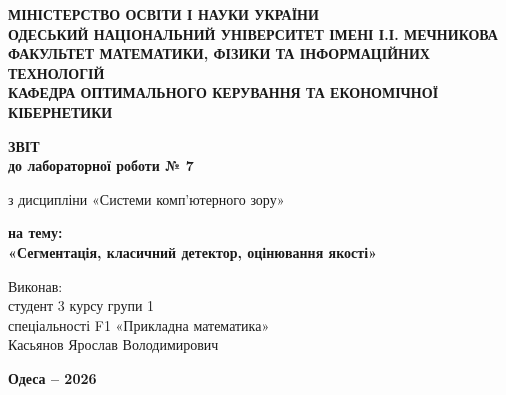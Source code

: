 \begin{titlepage}
    \thispagestyle{empty}
    \setlength{\parindent}{0pt}
    
    \begin{center}
        {\fontsize{12pt}{16pt}\selectfont\bfseries
        МІНІСТЕРСТВО ОСВІТИ І НАУКИ УКРАЇНИ\\[3pt]
        ОДЕСЬКИЙ НАЦІОНАЛЬНИЙ УНІВЕРСИТЕТ ІМЕНІ І.І. МЕЧНИКОВА\\[3pt]
        ФАКУЛЬТЕТ МАТЕМАТИКИ, ФІЗИКИ ТА ІНФОРМАЦІЙНИХ ТЕХНОЛОГІЙ\\[3pt]
        КАФЕДРА ОПТИМАЛЬНОГО КЕРУВАННЯ ТА ЕКОНОМІЧНОЇ КІБЕРНЕТИКИ\par}
    \end{center}

    \vspace{1.5cm}

    \begin{center}
        {\fontsize{18pt}{22pt}\selectfont\bfseries ЗВІТ\\
        до лабораторної роботи № 7\par}
        \vspace{0.4cm}
        {\fontsize{14pt}{18pt}\selectfont
        з дисципліни «Системи комп’ютерного зору»\par}
        \vspace{0.4cm}
        {\fontsize{16pt}{20pt}\selectfont\bfseries
        на тему:\\[6pt]
        «Сегментація, класичний детектор, оцінювання якості»\par}
    \end{center}

    \vspace{1.5cm}

    \hfill
    \begin{minipage}{0.60\textwidth}
        \raggedright
        {\fontsize{14pt}{19pt}\selectfont
        Виконав:\\[2pt]
        студент 3 курсу групи 1\\[2pt]
        спеціальності F1 «Прикладна математика»\\[2pt]
        Касьянов Ярослав Володимирович
        }
    \end{minipage}

    \vfill

    \begin{center}
        {\fontsize{12pt}{14pt}\selectfont\bfseries Одеса -- 2026\par}
    \end{center}
\end{titlepage}

\setcounter{page}{2}
